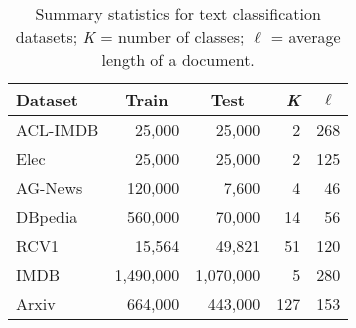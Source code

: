\documentclass[letterpaper]{article}
\begin{document}
\begin{table}[b]
\small
\centering
\begin{tabular}{@{}l|r r r r@{}}
 \toprule
 \textbf{Dataset} & \multicolumn{1}{c}{\textbf{Train}} & \multicolumn{1}{c}{\textbf{Test}} & \textit{\textbf{K}} & \multicolumn{1}{c}{$\boldsymbol{\ell}$}\\
 \midrule
 ACL-IMDB & 25,000 & 25,000 & 2 & 268 \\
 Elec & 25,000 & 25,000 & 2 & 125 \\
 AG-News & 120,000 & 7,600 & 4 & 46 \\
 DBpedia & 560,000 & 70,000 & 14 & 56 \\
 RCV1 & 15,564 & 49,821 & 51 & 120 \\
 IMDB & 1,490,000 & 1,070,000 & 5 & 280 \\
 Arxiv & 664,000 & 443,000 & 127 & 153 \\
 \bottomrule
 \end{tabular}
\caption{Summary statistics for text classification datasets; \textit{K} = number of classes; \textit{$\ell$} = average length of a document.}
\label{table:dataset_stat}
\end{table}
\end{document}
